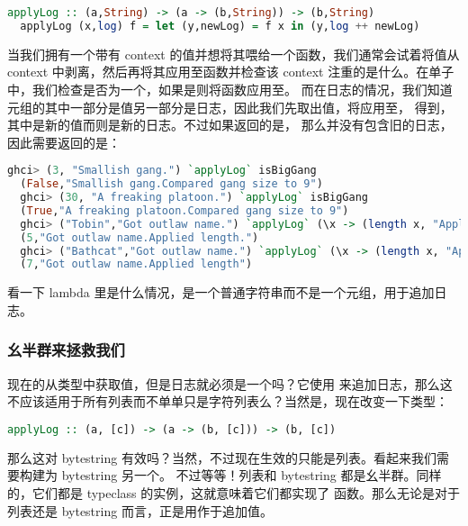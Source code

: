 \documentclass[./main.tex]{subfiles}
\begin{document}
\begin{lstlisting}[language=Haskell]
  applyLog :: (a,String) -> (a -> (b,String)) -> (b,String)
  applyLog (x,log) f = let (y,newLog) = f x in (y,log ++ newLog)
\end{lstlisting}

当我们拥有一个带有 context 的值并想将其喂给一个函数，我们通常会试着将值从 context 中剥离，然后再将其应用至函数并检查该
context 注重的是什么。在单子中，我们检查是否为一个，如果是则将函数应用至。
而在日志的情况，我们知道元组的其中一部分是值另一部分是日志，因此我们先取出值，将应用至，
得到，其中是新的值而则是新的日志。不过如果返回的是，
那么并没有包含旧的日志，因此需要返回的是：

\begin{lstlisting}[language=Haskell]
  ghci> (3, "Smallish gang.") `applyLog` isBigGang
  (False,"Smallish gang.Compared gang size to 9")
  ghci> (30, "A freaking platoon.") `applyLog` isBigGang
  (True,"A freaking platoon.Compared gang size to 9")
  ghci> ("Tobin","Got outlaw name.") `applyLog` (\x -> (length x, "Applied length."))
  (5,"Got outlaw name.Applied length.")
  ghci> ("Bathcat","Got outlaw name.") `applyLog` (\x -> (length x, "Applied length"))
  (7,"Got outlaw name.Applied length")
\end{lstlisting}

看一下 lambda 里是什么情况，是一个普通字符串而不是一个元组，用于追加日志。

\subsubsection*{幺半群来拯救我们}

现在的从类型中获取值，但是日志就必须是一个吗？它使用\acode{++}
来追加日志，那么这不应该适用于所有列表而不单单只是字符列表么？当然是，现在改变一下类型：

\begin{lstlisting}[language=Haskell]
  applyLog :: (a, [c]) -> (a -> (b, [c])) -> (b, [c])
\end{lstlisting}

那么这对 bytestring 有效吗？当然，不过现在生效的只能是列表。看起来我们需要构建为 bytestring 另一个。
不过等等！列表和 bytestring 都是幺半群。同样的，它们都是 typeclass 的实例，这就意味着它们都实现了
函数。那么无论是对于列表还是 bytestring 而言，正是用作于追加值。
\end{document}
